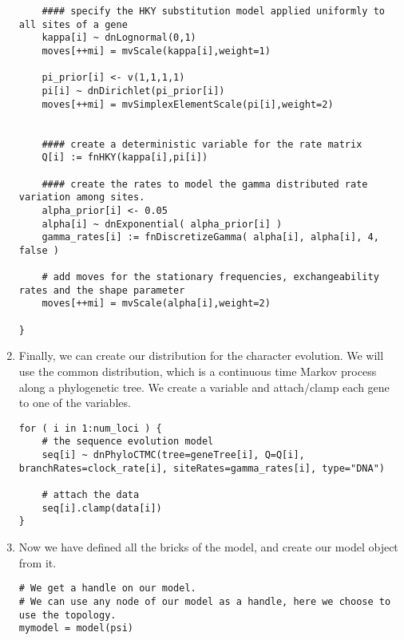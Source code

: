 \begin{enumerate}
{\begin{snugshade*}
\begin{lstlisting}
    #### specify the HKY substitution model applied uniformly to all sites of a gene
    kappa[i] ~ dnLognormal(0,1)
    moves[++mi] = mvScale(kappa[i],weight=1)

    pi_prior[i] <- v(1,1,1,1) 
    pi[i] ~ dnDirichlet(pi_prior[i])
    moves[++mi] = mvSimplexElementScale(pi[i],weight=2)


    #### create a deterministic variable for the rate matrix
    Q[i] := fnHKY(kappa[i],pi[i]) 

    #### create the rates to model the gamma distributed rate variation among sites.
    alpha_prior[i] <- 0.05
    alpha[i] ~ dnExponential( alpha_prior[i] )
    gamma_rates[i] := fnDiscretizeGamma( alpha[i], alpha[i], 4, false )

    # add moves for the stationary frequencies, exchangeability rates and the shape parameter
    moves[++mi] = mvScale(alpha[i],weight=2)

}

\end{lstlisting}
\end{snugshade*}}


\item Finally, we can create our distribution for the character evolution.
We will use the common  distribution, which is a continuous time Markov process along a phylogenetic tree.
We create a  variable and attach/clamp each gene to one of the  variables.
{\tt \begin{snugshade*}
\begin{lstlisting}
for ( i in 1:num_loci ) { 
    # the sequence evolution model
    seq[i] ~ dnPhyloCTMC(tree=geneTree[i], Q=Q[i], branchRates=clock_rate[i], siteRates=gamma_rates[i], type="DNA")

    # attach the data
    seq[i].clamp(data[i])
}
\end{lstlisting}
\end{snugshade*}}


\item Now we have defined all the bricks of the model, and create our model object from it.
{\tt \begin{snugshade*}
\begin{lstlisting}
# We get a handle on our model.
# We can use any node of our model as a handle, here we choose to use the topology.
mymodel = model(psi)
\end{lstlisting}
\end{snugshade*}}



\end{enumerate}
